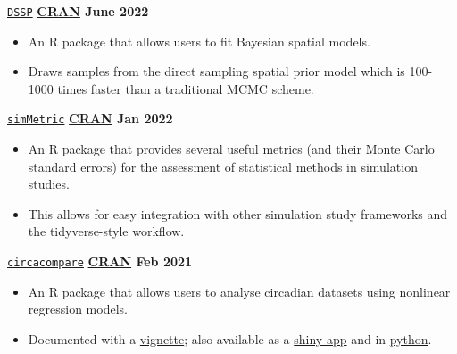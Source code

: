 \texttt{\href{https://github.com/gentrywhite/DSSP}{DSSP}} \hfill \textbf{\href{https://cran.r-project.org/package=DSSP}{CRAN} June 2022} \par
\begin{itemize}
    \item An R package that allows users to fit Bayesian spatial models.
    \item Draws samples from the direct sampling spatial prior model which is 100-1000 times faster than a traditional MCMC scheme.
\end{itemize}

\texttt{\href{https://github.com/RWParsons/simMetric}{simMetric}} \hfill \textbf{\href{https://cran.r-project.org/package=simMetric}{CRAN}  Jan 2022} \par
\begin{itemize}
    \item An R package that provides several useful metrics (and their Monte Carlo standard errors) for the assessment of statistical methods in simulation studies.
    \item This allows for easy integration with other simulation study frameworks and the tidyverse-style workflow.
\end{itemize}

\texttt{\href{https://github.com/RWParsons/circacompare}{circacompare}} \hfill \textbf{\href{https://cran.r-project.org/package=circacompare}{CRAN} Feb 2021} \par
\begin{itemize}
    \item An R package that allows users to analyse circadian datasets using nonlinear regression models.
    \item Documented with a \href{https://cran.r-project.org/web/packages/circacompare/vignettes/circacompare-vignette.html}{vignette}; also available as a \href{https://rwparsons.shinyapps.io/circacompare/}{shiny app} and in \href{https://github.com/RWParsons/circacompare_py}{python}.
\end{itemize}
